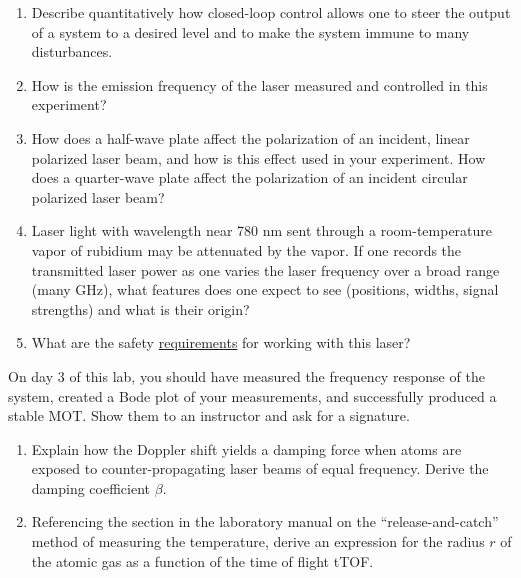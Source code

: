 \documentclass{../signatures}
\begin{document}
\maketitle

\names

\prelab

\begin{enumerate}

    \item Describe quantitatively how closed-loop control allows one to steer the output of a system to a desired level and to make the system immune to many disturbances.
    
    \item How is the emission frequency of the laser measured and controlled in this experiment?

    \item How does a half-wave plate affect the polarization of an incident, linear polarized laser beam, and how is this effect used in your experiment. How does a quarter-wave plate affect the polarization of an incident circular polarized laser beam?

    \item Laser light with wavelength near 780 nm sent through a room-temperature vapor of rubidium may be attenuated by the vapor. If one records the transmitted laser power as one varies the laser frequency over a broad range (many GHz), what features does one expect to see (positions, widths, signal strengths) and what is their origin?

    \item What are the safety \underline{requirements} for working with this laser?
       \\[36pt]
\end{enumerate}

\prelabsignatures

\midlab
On day 3 of this lab, you should have measured the frequency response of the system, created a Bode plot of your measurements, and successfully produced a stable MOT. Show them to an instructor and ask for a signature.
\begin{enumerate}
    \item Explain how the Doppler shift yields a damping force when atoms are exposed to counter-propagating laser beams of equal frequency. Derive the damping coefficient $\beta$.
    
    \item Referencing the section in the laboratory manual on the ``release-and-catch'' method of measuring the temperature, derive an expression for the radius $r$ of the atomic gas as a function of the time of flight tTOF.
\\[36pt]
\end{enumerate}
\end{document}
